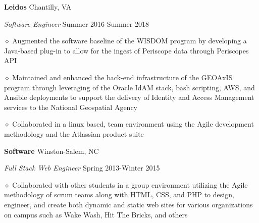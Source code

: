 \documentclass[executivepaper]{extarticle}
\begin{document}
\begin{center}
{\begin{minipage}{7.0in}
\vspace{2mm}

{\noindent \textbf{\fontsize{12}{8}\selectfont Leidos}} {\hfill \fontsize{10}{8}\selectfont Chantilly, VA}

\vspace{0.25mm}

{\noindent \textit{\fontsize{12}{8}\selectfont Software Engineer}} {\hfill \fontsize{10}{8}\selectfont Summer 2016-Summer 2018}

\vspace{1mm}

{\noindent $\diamond$ {\fontsize{12}{8}\selectfont Augmented the software baseline of the WISDOM program by developing a Java-based plug-in to allow for the ingest of Periscope data through Periscope\textsc{}s API}}

\vspace{1mm}

{\noindent $\diamond$ {\fontsize{12}{8}\selectfont Maintained and enhanced the back-end infrastructure of the GEOAxIS program through leveraging of the Oracle IdAM stack, bash scripting, AWS, and Ansible deployments to support the delivery of Identity and Access Management services to the National Geospatial Agency}}

\vspace{1mm}

{\noindent $\diamond$ {\fontsize{12}{8}\selectfont Collaborated in a linux based, team environment using the Agile development methodology and the Atlassian product suite}}

\vspace{2mm}

{\noindent \textbf{\fontsize{12}{8} Software}} {\hfill \fontsize{10}{8}\selectfont Winston-Salem, NC}

\vspace{1mm}

{\noindent \textit{\fontsize{12}{8}\selectfont Full Stack Web Engineer}} {\hfill \fontsize{10}{8}\selectfont Spring 2013-Winter 2015}

\vspace{1mm}

{\noindent $\diamond$ {\fontsize{12}{8}\selectfont Collaborated with other students in a group environment utilizing the Agile methodology of scrum teams along with
HTML, CSS, and PHP to design, engineer, and create both dynamic and static web sites for various organizations on campus such as Wake Wash, Hit The Bricks, and others}}


\end{minipage}}
\end{center}
\end{document}
